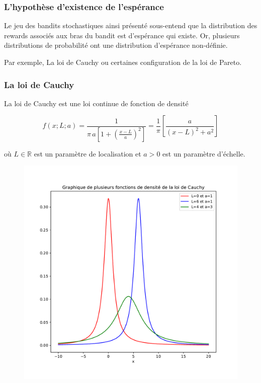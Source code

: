 \documentclass[8pt, sans]{beamer}
\begin{document}
\begin{frame}
\frametitle{L'hypothèse d'existence de l'espérance}
Le jeu des bandits stochastiques ainsi présenté sous-entend que la distribution des rewards associés aux bras du bandit est d'espérance qui existe. Or, plusieurs distributions de probabilité ont une distribution d'espérance non-définie. 

\pause
\vfill

Par exemple, La loi de Cauchy ou certaines configuration de la loi de Pareto.

\end{frame}

\begin{frame}
\frametitle{La loi de Cauchy}
La loi de Cauchy est une loi continue de fonction de densité 

$$f(x;L;a)=\frac{1}{\pi\,a\left[1+\left(\frac{x-L}{a}\right)^2\right]}=\frac{1}{\pi}\left[\frac{a}{(x-L)^2+a^2}\right]$$

où $L\in\mathbb{R}$ est un paramètre de localisation et $a>0$ est un paramètre d'échelle.

\pause

\begin{figure}[H]
\begin{center}
\includegraphics[scale=0.3]{graphiques_Cauchy.pdf}
\end{center}
\end{figure}

\end{frame}
\end{document}
